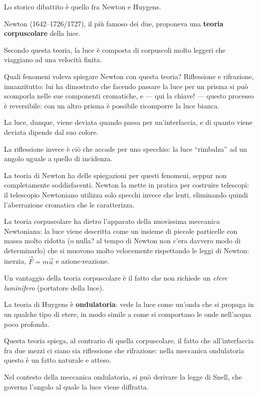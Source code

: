 \documentclass[a4paper,12pt]{article}
\begin{document}
Lo storico dibattito è quello fra Newton e Huygens. 

Newton (1642--1726/1727), il più famoso dei due, proponeva una \textbf{teoria corpuscolare} della luce. 

Secondo questa teoria, la luce è composta di corpuscoli molto leggeri che viaggiano ad una velocità finita. 

Quali fenomeni voleva spiegare Newton con questa teoria?
Riflessione e rifrazione, innanzitutto: lui ha dimostrato che facendo passare la luce per un prisma si può scomporla nelle sue componenti cromatiche, e --- qui la chiave! --- questo processo è reversibile: con un altro prisma è possibile ricomporre la luce bianca.

La luce, dunque, viene deviata quando passa per un'interfaccia, e di quanto viene deviata dipende dal suo colore. 

La riflessione invece è ciò che accade per uno specchio: la luce ``rimbalza'' ad un angolo uguale a quello di incidenza.

La teoria di Newton ha delle spiegazioni per questi fenomeni, seppur non completamente soddisfacenti.
Newton la mette in pratica per costruire telescopi: il telescopio Newtoniano utilizza solo specchi invece che lenti, eliminando quindi l'aberrazione cromatica che le caratterizza. 

La teoria corpuscolare ha dietro l'apparato della nuovissima meccanica Newtoniana: la luce viene descritta come un insieme di piccole particelle con massa molto ridotta (o nulla? al tempo  di Newton non c'era davvero modo di determinarlo) che si muovono molto velocemente rispettando le leggi di Newton: inerzia, \(\vec{F} = m \vec{a}\) e azione-reazione.

Un vantaggio della teoria corpuscolare è il fatto che non richiede un \emph{etere luminifero} (portatore della luce). 

La teoria di Huygens è \textbf{ondulatoria}: vede la luce come un'onda che si propaga in un qualche tipo di etere, in modo simile a come si comportano le onde nell'acqua poco profonda.

Questa teoria spiega, al contrario di quella corpuscolare, il fatto che all'interfaccia fra due mezzi ci siano sia riflessione che rifrazione: nella meccanica ondulatoria questo è un fatto naturale e atteso.

Nel contesto della meccanica ondulatoria, si può derivare la legge di Snell, che governa l'angolo al quale la luce viene diffratta. 
\end{document}
